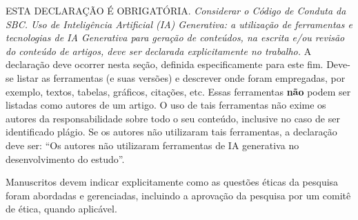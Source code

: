 \documentclass[portuguese]{sbc2025}%
\begin{document}
\begin{declarations}
\begin{aitools}
ESTA DECLARAÇÃO É OBRIGATÓRIA.  
\textit{Considerar o Código de Conduta da SBC.
Uso de Inteligência Artificial (IA) Generativa: 
a utilização de ferramentas e tecnologias de IA Generativa para geração de conteúdos, 
na escrita e/ou revisão do conteúdo de artigos, deve ser declarada explicitamente no trabalho.} 
A declaração deve ocorrer nesta seção, definida especificamente para este fim.
Deve-se listar as ferramentas (e suas versões) e descrever onde foram empregadas, por exemplo, 
textos, tabelas, gráficos, citações, etc. 
Essas ferramentas \textbf{não} podem ser listadas como autores de um artigo. 
O uso de tais ferramentas não exime os autores da responsabilidade 
sobre todo o seu conteúdo, inclusive no caso de ser identificado plágio.
%
Se os autores não utilizaram tais ferramentas, a declaração deve ser: 
``Os autores não utilizaram ferramentas de IA generativa no desenvolvimento do estudo''.
%
\end{aitools}

\begin{furtherinformation}
Manuscritos devem indicar explicitamente como as questões éticas da pesquisa foram abordadas e gerenciadas, 
incluindo a aprovação da pesquisa por um comitê de ética, quando aplicável.
\end{furtherinformation}

\end{declarations}



\end{document}
